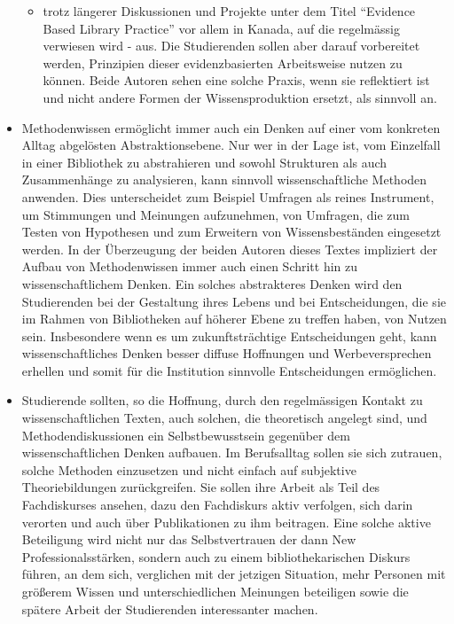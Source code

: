\documentclass[a4paper,
fontsize=11pt,
oneside,
numbers=noperiodatend,
parskip=half-,
bibliography=totoc,
final
]{scrartcl}
\begin{document}
\begin{itemize}
  \begin{itemize}
  \itemsep1pt\parskip0pt
  \item
    trotz längerer Diskussionen und Projekte unter dem Titel
    \enquote{Evidence Based Library Practice} vor allem in Kanada, auf
    die regelmässig verwiesen wird - aus. Die Studierenden sollen aber
    darauf vorbereitet werden, Prinzipien dieser evidenzbasierten
    Arbeitsweise nutzen zu können. Beide Autoren sehen eine solche
    Praxis, wenn sie reflektiert ist und nicht andere Formen der
    Wissensproduktion ersetzt, als sinnvoll an.
  \end{itemize}
\item
  Methodenwissen ermöglicht immer auch ein Denken auf einer vom
  konkreten Alltag abgelösten Abstraktionsebene. Nur wer in der Lage
  ist, vom Einzelfall in einer Bibliothek zu abstrahieren und sowohl
  Strukturen als auch Zusammenhänge zu analysieren, kann sinnvoll
  wissenschaftliche Methoden anwenden. Dies unterscheidet zum Beispiel
  Umfragen als reines Instrument, um Stimmungen und Meinungen
  aufzunehmen, von Umfragen, die zum Testen von Hypothesen und zum
  Erweitern von Wissensbeständen eingesetzt werden. In der Überzeugung
  der beiden Autoren dieses Textes impliziert der Aufbau von
  Methodenwissen immer auch einen Schritt hin zu wissenschaftlichem
  Denken. Ein solches abstrakteres Denken wird den Studierenden bei der
  Gestaltung ihres Lebens und bei Entscheidungen, die sie im Rahmen von
  Bibliotheken auf höherer Ebene zu treffen haben, von Nutzen sein.
  Insbesondere wenn es um zukunftsträchtige Entscheidungen geht, kann
  wissenschaftliches Denken besser diffuse Hoffnungen und
  Werbeversprechen erhellen und somit für die Institution sinnvolle
  Entscheidungen ermöglichen.
\item
  Studierende sollten, so die Hoffnung, durch den regelmässigen Kontakt
  zu wissenschaftlichen Texten, auch solchen, die theoretisch angelegt
  sind, und Methodendiskussionen ein Selbstbewusstsein gegenüber dem
  wissenschaftlichen Denken aufbauen. Im Berufsalltag sollen sie sich
  zutrauen, solche Methoden einzusetzen und nicht einfach auf subjektive
  Theoriebildungen zurückgreifen. Sie sollen ihre Arbeit als Teil des
  Fachdiskurses ansehen, dazu den Fachdiskurs aktiv verfolgen, sich
  darin verorten und auch über Publikationen zu ihm beitragen. Eine
  solche aktive Beteiligung wird nicht nur das Selbstvertrauen der dann
  New Professionalsstärken, sondern auch zu einem bibliothekarischen
  Diskurs führen, an dem sich, verglichen mit der jetzigen Situation,
  mehr Personen mit größerem Wissen und unterschiedlichen Meinungen
  beteiligen sowie die spätere Arbeit der Studierenden interessanter
  machen.
\end{itemize}
\end{document}
